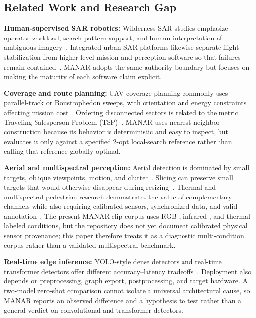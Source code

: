 \subsection{Related Work and Research Gap}

\textbf{Human-supervised SAR robotics:} Wilderness SAR studies emphasize operator workload, search-pattern support, and human interpretation of ambiguous imagery~\cite{goodrich2008towards}. Integrated urban SAR platforms likewise separate flight stabilization from higher-level mission and perception software so that failures remain contained~\cite{tomic2012autonomous}. MANAR adopts the same authority boundary but focuses on making the maturity of each software claim explicit.

\textbf{Coverage and route planning:} UAV coverage planning commonly uses parallel-track or Boustrophedon sweeps, with orientation and energy constraints affecting mission cost~\cite{lin2009uav,torres2016coverage,otto2018optimization}. Ordering disconnected sectors is related to the metric Traveling Salesperson Problem (TSP)~\cite{applegate2006traveling}. MANAR uses nearest-neighbor construction because its behavior is deterministic and easy to inspect, but evaluates it only against a specified 2-opt local-search reference rather than calling that reference globally optimal.

\textbf{Aerial and multispectral perception:} Aerial detection is dominated by small targets, oblique viewpoints, motion, and clutter~\cite{du2018uavdt,zhu2021visdrone}. Slicing can preserve small targets that would otherwise disappear during resizing~\cite{akyon2022sahi}. Thermal and multispectral pedestrian research demonstrates the value of complementary channels while also requiring calibrated sensors, synchronized data, and valid annotation~\cite{portmann2014thermal,hwang2015multispectral}. The present MANAR clip corpus uses RGB-, infrared-, and thermal-labeled conditions, but the repository does not yet document calibrated physical sensor provenance; this paper therefore treats it as a diagnostic multi-condition corpus rather than a validated multispectral benchmark.

\textbf{Real-time edge inference:} YOLO-style dense detectors and real-time transformer detectors offer different accuracy--latency tradeoffs~\cite{jocher2023yolo,zhao2024detrs,peng2024dfine}. Deployment also depends on preprocessing, graph export, postprocessing, and target hardware. A two-model zero-shot comparison cannot isolate a universal architectural cause, so MANAR reports an observed difference and a hypothesis to test rather than a general verdict on convolutional and transformer detectors.

